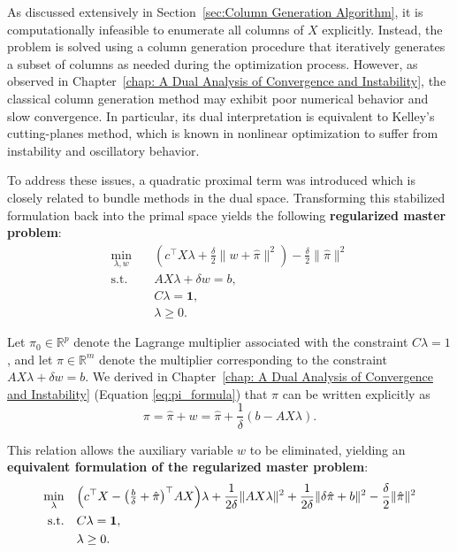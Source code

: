 \documentclass{book}
\theoremstyle{definition}
\numberwithin{algorithm_}{chapter}
\begin{document}
As discussed extensively in Section~\ref{sec:Column Generation Algorithm}, it is computationally infeasible to enumerate all columns of $X$ explicitly. Instead, the problem is solved using a column generation procedure that iteratively generates a subset of columns as needed during the optimization process.
However, as observed in Chapter~\ref{chap: A Dual Analysis of Convergence and Instability}, the classical column generation method may exhibit poor numerical behavior and slow convergence. In particular, its dual interpretation is equivalent to Kelley’s cutting-planes method, which is known in nonlinear optimization to suffer from instability and oscillatory behavior.

\bigskip

To address these issues, a quadratic proximal term was introduced which is closely related to bundle methods in the dual space. Transforming this stabilized formulation back into the primal space yields the following \textbf{regularized master problem}:
\begin{subequations} \label{eq:explicit}
\begin{align}
\min_{\lambda, w} \quad 
& \left( c^\top X \lambda
+ \frac{\delta}{2} \| w + \hat{\pi} \|^2 \right)
- \frac{\delta}{2} \| \hat{\pi} \|^2
\\
\text{s.t.} \quad
& A X \lambda + \delta w = b,
\\
& C \lambda = \mathbf{1},
\\
& \lambda \ge 0.
\end{align}
\end{subequations}

Let $\pi_0 \in \mathbb{R}^p$ denote the Lagrange multiplier associated with the constraint $C\lambda = 1$, and let $\pi \in \mathbb{R}^m$ denote the multiplier corresponding to the constraint $AX\lambda + \delta w = b$. We derived in Chapter~\ref{chap: A Dual Analysis of Convergence and Instability} (Equation \eqref{eq:pi_formula}) that $\pi$ can be written explicitly as
\begin{equation} \label{eq:pi_explicit}
	\pi = \hat{\pi} + w = \hat{\pi} + \frac{1}{\delta}(b - AX\lambda).
\end{equation}

This relation allows the auxiliary variable $w$ to be eliminated, yielding an \textbf{equivalent formulation of the regularized master problem}:
\begin{subequations} \label{eq:eliminated}
\begin{align}
\min_{\lambda} \quad
&
\Bigl(
c^\top X
-
\bigl( \tfrac{b}{\delta} + \hat{\pi} \bigr)^\top A X
\Bigr) \lambda
+
\frac{1}{2\delta} \| A X \lambda \|^2
+
\frac{1}{2\delta} \| \delta \hat{\pi} + b \|^2
-
\frac{\delta}{2} \| \hat{\pi} \|^2
\\
\text{s.t.} \quad
& C \lambda = \mathbf{1},
\\
& \lambda \ge 0.
\end{align}
\end{subequations}
\end{document}
